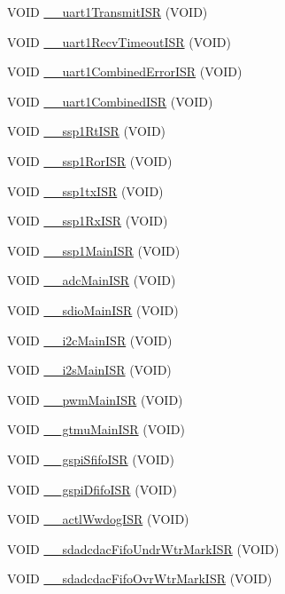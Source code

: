 \begin{DoxyCompactItemize}
\item 
VOID \hyperlink{a00531_a9afca2b472bf2677a5df821408f48964}{\_\-\_\-uart1TransmitISR} (VOID)
\item 
VOID \hyperlink{a00531_aaedaaac8c9240dc52bd366a2378efc4f}{\_\-\_\-uart1RecvTimeoutISR} (VOID)
\item 
VOID \hyperlink{a00531_a768fac4767a964b8426e18033d401538}{\_\-\_\-uart1CombinedErrorISR} (VOID)
\item 
VOID \hyperlink{a00531_a0952d1ce8a41a80cf2e095deec2b7dc2}{\_\-\_\-uart1CombinedISR} (VOID)
\item 
VOID \hyperlink{a00531_a308c212edc1236ef58084bcf2e9c5d96}{\_\-\_\-ssp1RtISR} (VOID)
\item 
VOID \hyperlink{a00531_a570e372ceab004b7ca5ab2566971a7d5}{\_\-\_\-ssp1RorISR} (VOID)
\item 
VOID \hyperlink{a00531_a417bfb54805182b64630ca98bc09d73f}{\_\-\_\-ssp1txISR} (VOID)
\item 
VOID \hyperlink{a00531_a44fffcfd5b0d0bac005ddefebbd6bfbc}{\_\-\_\-ssp1RxISR} (VOID)
\item 
VOID \hyperlink{a00531_a40b5668d5797dea8ecea8a52a1ab5111}{\_\-\_\-ssp1MainISR} (VOID)
\item 
VOID \hyperlink{a00531_a2b0c62030ef52c2ac8bd5137546ec657}{\_\-\_\-adcMainISR} (VOID)
\item 
VOID \hyperlink{a00531_a3e8716c56fc7627ba051f3dde243be66}{\_\-\_\-sdioMainISR} (VOID)
\item 
VOID \hyperlink{a00531_a791c16670b1b5606595cd6324980673c}{\_\-\_\-i2cMainISR} (VOID)
\item 
VOID \hyperlink{a00531_a5536173d77715830754fba2ce62ec9e8}{\_\-\_\-i2sMainISR} (VOID)
\item 
VOID \hyperlink{a00531_ab6d609f03408ed8a20104a29d568aa6c}{\_\-\_\-pwmMainISR} (VOID)
\item 
VOID \hyperlink{a00531_ae28546652db82b4dbcf1ebbec6d6daae}{\_\-\_\-gtmuMainISR} (VOID)
\item 
VOID \hyperlink{a00531_a725bb43a6c671c2c912ea9baad8ff367}{\_\-\_\-gspiSfifoISR} (VOID)
\item 
VOID \hyperlink{a00531_a5d3d694f93df7bc33822644706e407f5}{\_\-\_\-gspiDfifoISR} (VOID)
\item 
VOID \hyperlink{a00531_ad083327380c8b104700ee10f678a37ad}{\_\-\_\-actlWwdogISR} (VOID)
\item 
VOID \hyperlink{a00531_ade1fe4b96ba6cb86f2a7d7de09ffe3d8}{\_\-\_\-sdadcdacFifoUndrWtrMarkISR} (VOID)
\item 
VOID \hyperlink{a00531_a6d4f2074c47db2924d06a2cbb006d872}{\_\-\_\-sdadcdacFifoOvrWtrMarkISR} (VOID)
\end{DoxyCompactItemize}



